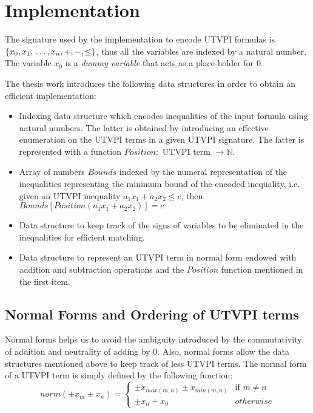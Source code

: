 \section{Implementation}

The signature used by the 
implementation to encode UTVPI formulas
is $\{x_0, x_1, \\ \dots, x_n, +,
-, \leq \}$, thus all the variables are indexed by a natural number. 
The variable $x_0$ is a
\emph{dummy variable} that acts as a place-holder for 0. 

The thesis work introduces the following data structures
in order to obtain an efficient implementation:

\begin{itemize}
  \item Indexing data structure
    which encodes inequalities of the input formula 
    using natural numbers. The latter is obtained
    by introducing an effective enumeration on the
    UTVPI terms in a given UTVPI signature. The
    latter is represented with a function
    $Position : \text{ UTVPI term } \rightarrow \mathbb{N}$.
  \item Array of numbers $Bounds$ indexed by the 
    numeral representation of the inequalities 
    representing the minimum bound of 
    the encoded inequality, i.e. given an UTVPI
    inequality $a_1 x_1 + a_2 x_2 \leq c$,
    then $Bounds[Position(a_1 x_1 + a_2 x_2)] = c$
  \item Data structure to keep 
    track of the signs of variables to be eliminated
    in the inequalities for efficient matching.
  \item Data structure to represent an UTVPI
    term in normal form endowed with addition and subtraction 
    operations and the $Position$ function mentioned
    in the first item.
\end{itemize}

\subsection{Normal Forms and Ordering of UTVPI terms}

Normal forms helps us to avoid the ambiguity introduced
by the commutativity of addition and neutrality of adding
by 0.
Also, normal forms allow the data
structures mentioned above to keep track of less UTVPI terms.
The normal form of a UTVPI term is simply defined by the
following function: 
\begin{equation*}
  norm(\pm x_m \pm x_n) = 
  \begin{cases} 
    \pm x_{max(m, n)} \pm x_{min(m, n)} & \text{if } m \neq n \\
    \pm x_{n} + x_0  & otherwise
  \end{cases}
\end{equation*}

